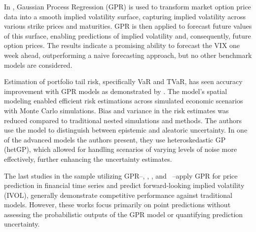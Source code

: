 In \textcite{tegner2021probabilistic}, Gaussian Process Regression (GPR) is used to transform market option price data into a smooth implied volatility surface, capturing implied volatility across various strike prices and maturities. GPR is then applied to forecast future values of this surface, enabling predictions of implied volatility and, consequently, future option prices. The results indicate a promising ability to forecast the VIX one week ahead, outperforming a naive forecasting approach, but no other benchmark models are considered.

Estimation of portfolio tail risk, specifically VaR and TVaR, has seen accuracy improvement with GPR models as demonstrated by \textcite{Risk2018gpr}. The model's spatial modeling enabled efficient risk estimations across simulated economic scenarios with Monte Carlo simulations. Bias and variance in the risk estimates was reduced compared to traditional nested simulations and methods. The authors use the model to distinguish between epistemic and aleatoric uncertainty. In one of the advanced models the authors present, they use heteroskedastic GP (hetGP), which allowed for handling scenarios of varying levels of noise more effectively, further enhancing the uncertainty estimates. 

The last studies in the sample utilizing GPR--\textcite{Papaioannou2022gpr}, \textcite{Zmuk2020gpr}, \textcite{Park2014gpr}, and ~\textcite{DeSpiegeleer2018gpr}--apply GPR for price prediction in financial time series and \textcite{Hocht2024gpr} predict forward-looking implied volatility (IVOL), generally demonstrate competitive performance against traditional models. However, these works focus primarily on point predictions without assessing the probabilistic outputs of the GPR model or quantifying prediction uncertainty.






